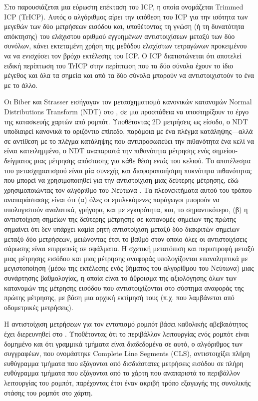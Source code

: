 Στο \cite{Chetverikova} παρουσιάζεται μια εύρωστη επέκταση του ICP, η οποία
ονομάζεται Trimmed ICP (TrICP). Αυτός ο αλγόριθμος αίρει την υπόθεση του ICP
για την ισότητα των μεγεθών των δύο μετρήσεων εισόδου και, υποθέτοντας τη γνώση
(ή τη δυνατότητα απόκτησης) του ελάχιστου αριθμού εγγυημένων αντιστοιχίσεων
μεταξύ των δύο συνόλων, κάνει εκτεταμένη χρήση της μεθόδου ελαχίστων τετραγώνων
\cite{Rousseeuw1984} προκειμένου να να ενισχύσει τον βρόχο εκτέλεσης του ICP.
Ο ICP διαπιστώνεται ότι αποτελεί ειδική περίπτωση του TrICP στην περίπτωση που
τα δύο σύνολα έχουν το ίδιο μέγεθος και όλα τα σημεία και από τα δύο σύνολα
μπορούν να αντιστοιχιστούν το ένα με το άλλο.

Οι Biber και Strasser εισήγαγαν τον μετασχηματισμό κανονικών κατανομών Normal
Distributions Transform (NDT) στο \cite{Bibera}, σε μια προσπάθεια να
υποστηρίξουν το έργο της κατασκευής χαρτών από ρομπότ. Υποθέτοντας 2D μετρήσεις
ως είσοδο, ο NDT υποδιαιρεί κανονικά το οριζόντιο επίπεδο, παρόμοια με ένα
πλέγμα κατάληψης---αλλά σε αντίθεση με το πλέγμα κατάληψης που αντιπροσωπεύει
την πιθανότητα ένα κελί να είναι κατειλημμένο, ο NDT αναπαριστά την πιθανότητα
μέτρησης ενός σημείου-δείγματος μιας μέτρησης απόστασης για κάθε θέση
\textit{εντός} του κελιού. Το αποτέλεσµα του µετασχηµατισµού είναι μία συνεχής
και διαφοροποιήσιμη πυκνότητα πιθανότητας που μπορεί να χρησιμοποιηθεί για την
αντιστοίχιση μιας δεύτερης μέτρησης, εδώ χρησιμοποιώντας τον αλγόριθμο του
Νεύτωνα \cite{Suli2003}. Τα πλεονεκτήματα αυτού του τρόπου αναπαράστασης είναι
ότι (α) όλες οι εμπλεκόμενες παράγωγοι μπορούν να υπολογιστούν αναλυτικά,
γρήγορα, και με εγκυρότητα, και, το σημαντικότερο, (β) η αντιστοίχιση σημείων
της δεύτερης μέτρησης σε κατανομές σημείων της πρώτης σημαίνει ότι δεν υπάρχει
καμία ρητή αντιστοίχιση μεταξύ δύο διακριτών σημείων μεταξύ δύο μετρήσεων,
μειώνοντας έτσι το βαθμό στον οποίο όλες οι αντιστοιχίσεις σάρωσης είναι
επιρρεπείς σε σφάλματα. Η σχετική μετατόπιση και περιστροφή μεταξύ μιας
μέτρησης εισόδου και μιας μέτρησης αναφοράς υπολογίζονται επαναληπτικά με
μεγιστοποίηση (μέσω της εκτέλεσης ενός βήματος του αλγορίθμου του Νεύτωνα) μιας
συνάρτησης βαθμολογίας, η οποία είναι το άθροισμα της αξιολόγησης όλων των
κατανομών της μέτρησης εισόδου που αντιστοιχίζονται στο σύστημα αναφοράς της
πρώτης μέτρησης, με βάση μια αρχική εκτίμησή τους (π.χ. που λαμβάνεται από
οδομετρικές μετρήσεις).

Η αντιστοίχιση μετρήσεων για τον εντοπισμό ρομπότ βάσει καθολικής αβεβαιότητος
έχει διερευνηθεί στο \cite{XuZezhong}. Υποθέτοντας ότι το περιβάλλον
λειτουργίας ενός ρομπότ είναι δομημένο και ότι γραμμικά τμήματα είναι
διαδεδομένα σε αυτό, ο αλγόριθμος των συγγραφέων, που ονομάστηκε Complete Line
Segments (CLS), αντιστοιχίζει πλήρη ευθύγραμμα τμήματα που εξάγονται από
δισδιάστατες μετρήσεις εισόδου σε πλήρη ευθύγραμμα τμήματα που εξάγονται από το
χάρτη που αναπαριστά το περιβάλλον λειτουργίας του ρομπότ, παρέχοντας έτσι έναν
ακριβή τρόπο εξαγωγής της συνολικής στάσης του ρομπότ στο χάρτη.

